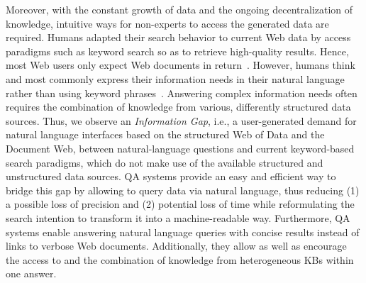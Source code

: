 Moreover, with the constant growth of data and the ongoing decentralization of knowledge, intuitive ways for non-experts to access the generated data are required. 
Humans adapted their search behavior to current Web data by access paradigms such as keyword search so as to retrieve high-quality results.
Hence, most Web users only expect Web documents in return~\cite{ilprints361}.
However, humans think and most commonly express their information needs  in their natural language rather than using keyword phrases~\cite{woods1973progress}. 
Answering complex information needs often requires the combination of knowledge from various, differently structured data sources.
Thus, we observe an \emph{Information Gap}, i.e., a user-generated demand for natural language interfaces based on the structured Web of Data and the Document Web, between natural-language questions and current keyword-based search paradigms, which do not make use of the available structured and unstructured data sources.
\ac{QA} systems provide an easy and efficient way to bridge this gap by allowing to query data via natural language, thus reducing (1) a possible loss of precision and (2) potential loss of time while reformulating the search intention to transform it into a machine-readable way.
Furthermore, QA systems enable answering natural language queries with concise results instead of  links to verbose Web documents. 
Additionally, they allow as well as encourage the access  to and the combination of knowledge from heterogeneous \ac{KB}s within one answer.

